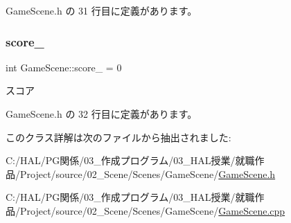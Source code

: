 Game\+Scene.\+h の 31 行目に定義があります。

\mbox{\label{class_game_scene_afe49ee089b9ad8415f7ab432a3c554aa}} 
\subsubsection{\texorpdfstring{score\+\_\+}{score\_}}
{\footnotesize\ttfamily int Game\+Scene\+::score\+\_\+ = 0\hspace{0.3cm}{\ttfamily [private]}}



スコア 



 Game\+Scene.\+h の 32 行目に定義があります。



このクラス詳解は次のファイルから抽出されました\+:\begin{DoxyCompactItemize}
\item 
C\+:/\+H\+A\+L/\+P\+G関係/03\+\_\+作成プログラム/03\+\_\+\+H\+A\+L授業/就職作品/\+Project/source/02\+\_\+\+Scene/\+Scenes/\+Game\+Scene/\mbox{\hyperlink{_game_scene_8h}{Game\+Scene.\+h}}\item 
C\+:/\+H\+A\+L/\+P\+G関係/03\+\_\+作成プログラム/03\+\_\+\+H\+A\+L授業/就職作品/\+Project/source/02\+\_\+\+Scene/\+Scenes/\+Game\+Scene/\mbox{\hyperlink{_game_scene_8cpp}{Game\+Scene.\+cpp}}\end{DoxyCompactItemize}
